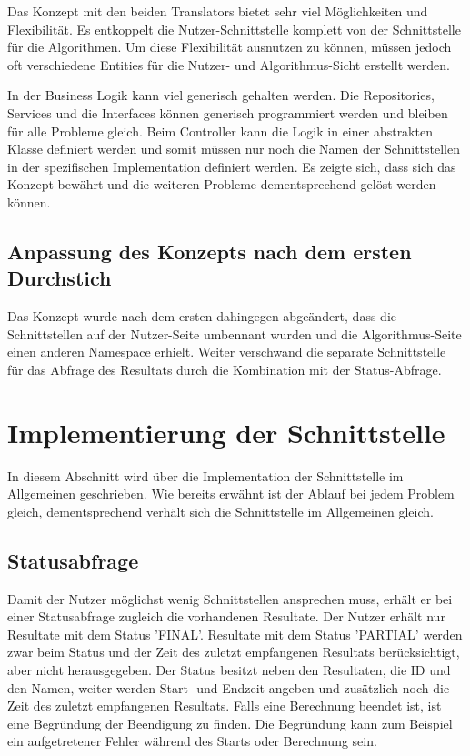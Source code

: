 Das Konzept mit den beiden Translators bietet sehr viel Möglichkeiten und Flexibilität. Es entkoppelt die Nutzer-Schnittstelle komplett von der Schnittstelle für die Algorithmen. Um diese 
Flexibilität ausnutzen zu können, müssen jedoch oft verschiedene Entities für die Nutzer- und Algorithmus-Sicht erstellt werden.

In der Business Logik kann viel generisch gehalten werden. Die Repositories, Services und die Interfaces können generisch programmiert werden und bleiben für alle Probleme gleich. Beim 
Controller kann die Logik in einer abstrakten Klasse definiert werden und somit müssen nur noch die Namen der Schnittstellen in der spezifischen Implementation definiert werden. Es zeigte sich, 
dass sich das Konzept bewährt und die weiteren Probleme dementsprechend gelöst werden können.

\subsection{Anpassung des Konzepts nach dem ersten Durchstich}\label{doings_prototyp}
Das Konzept wurde nach dem ersten  dahingegen abgeändert, dass die Schnittstellen auf der Nutzer-Seite umbennant wurden und die Algorithmus-Seite einen anderen Namespace 
erhielt. Weiter verschwand die separate Schnittstelle für das Abfrage des Resultats durch die Kombination mit der Status-Abfrage.

\section{Implementierung der Schnittstelle}\label{impl_interface}
In diesem Abschnitt wird über die Implementation der Schnittstelle im Allgemeinen geschrieben. Wie bereits erwähnt ist der Ablauf bei jedem Problem gleich, dementsprechend verhält sich die 
Schnittstelle im Allgemeinen gleich.

\subsection{Statusabfrage}
Damit der Nutzer möglichst wenig Schnittstellen ansprechen muss, erhält er bei einer Statusabfrage zugleich die vorhandenen Resultate. Der Nutzer erhält nur Resultate mit dem Status 'FINAL'. 
Resultate mit dem Status 'PARTIAL' werden zwar beim Status und der Zeit des zuletzt empfangenen Resultats berücksichtigt, aber nicht herausgegeben. Der Status besitzt neben den 
Resultaten, die ID und den Namen, weiter werden Start- und Endzeit angeben und zusätzlich noch die Zeit des zuletzt empfangenen Resultats. Falls eine Berechnung beendet ist, ist eine 
Begründung der Beendigung zu finden. Die Begründung kann zum Beispiel ein aufgetretener Fehler während des Starts oder Berechnung sein.

